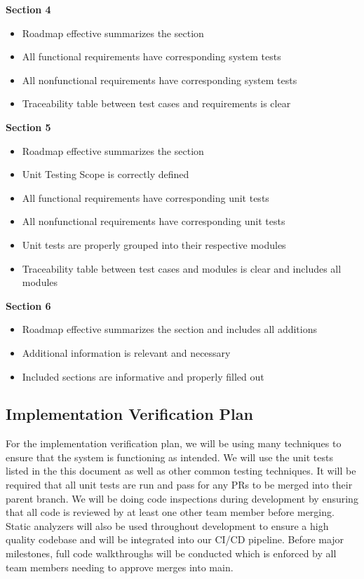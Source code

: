 \documentclass[12pt, titlepage]{article}
\begin{document}
\noindent
\textbf{Section 4}
\begin{itemize}
  \item Roadmap effective summarizes the section
  \item All functional requirements have corresponding system tests
  \item All nonfunctional requirements have corresponding system tests
  \item Traceability table between test cases and requirements is clear
\end{itemize}
\noindent
\textbf{Section 5}
\begin{itemize}
  \item Roadmap effective summarizes the section
  \item Unit Testing Scope is correctly defined
  \item All functional requirements have corresponding unit tests
  \item All nonfunctional requirements have corresponding unit tests
  \item Unit tests are properly grouped into their respective modules
  \item Traceability table between test cases and modules is clear and includes all modules
\end{itemize}
\noindent
\textbf{Section 6}
\begin{itemize}
  \item Roadmap effective summarizes the section and includes all additions
  \item Additional information is relevant and necessary
  \item Included sections are informative and properly filled out
\end{itemize}


\subsection{Implementation Verification Plan}

For the implementation verification plan, we will be using many techniques to ensure that the system is functioning as intended.
We will use the unit tests listed in the this document as well as other common testing techniques.
It will be required that all unit tests are run and pass for any PRs to be merged into their parent branch.
We will be doing code inspections during development by ensuring that all code is reviewed by at least one other team member before merging.
Static analyzers will also be used throughout development to ensure a high quality codebase and will be integrated into our CI/CD pipeline.
Before major milestones, full code walkthroughs will be conducted which is enforced by all team members needing to approve merges into main.
\end{document}
